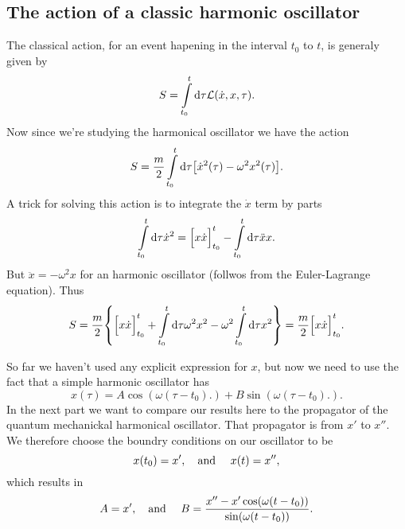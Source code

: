 \documentclass[11pt,letter, swedish, english
]{article}
\begin{document}
\subsection{The action of a classic harmonic oscillator}
The classical action, for an event hapening in the interval $t_0$ to
$t$, is generaly given by 
\begin{equation}
S=\int_{t_0}^{t}\rd\tau\mathcal{L}(\dot{x}, x, \tau).
\end{equation}
Now since we're studying the harmonical oscillator we have the action
\begin{equation}
S=\frac{m}{2}\int_{t_0}^{t}\rd\tau
\qty[\dot{x}^2(\tau)-\omega^2x^2(\tau)]. 
\end{equation}
A trick for solving this action is to integrate the $\dot{x}$ term by
parts
\begin{equation}
\int_{t_0}^{t}\rd\tau\dot{x}^2
=\Big[x\dot{x}\Big]_{t_0}^t-\int_{t_0}^{t}\rd\tau\ddot{x}x.
\end{equation}
But $\ddot{x}=-\omega^2x$ for an harmonic oscillator (follwos from the
Euler-Lagrange equation). Thus
\begin{equation}\label{eq:3_S1}
S=\frac{m}{2} \qty{\Big[x\dot{x}\Big]_{t_0}^t
+\int_{t_0}^{t}\rd\tau \omega^2x^2
-\omega^2\int_{t_0}^{t}\rd\tau x^2}
=\frac{m}{2} \Big[x\dot{x}\Big]_{t_0}^t.
\end{equation}

So far we haven't used any explicit expression for $x$, but now we
need to use the fact that a simple harmonic oscillator has
\begin{equation}\label{eq:3_x}
x(\tau) = A\cos(\omega(\tau-t_0)\Big.) 
+B\sin(\omega(\tau-t_0)\Big.). 
\end{equation}
In the next part we want to compare our results here to the propagator
of the quantum mechanickal harmonical oscillator. That propagator is
from $x'$ to $x''$. We therefore choose the boundry conditions on our
oscillator to be
\begin{equation}
x(t_0)=x'\qcomma\text{and }\quad x(t)=x'',
\end{equation}
which results in
\begin{equation}\label{eq:3_AB}
A=x'\qcomma\text{and }\quad
B=\frac{x''-x'\cos(\omega(t-t_0))}{\sin(\omega(t-t_0))}.
\end{equation}
\end{document}
